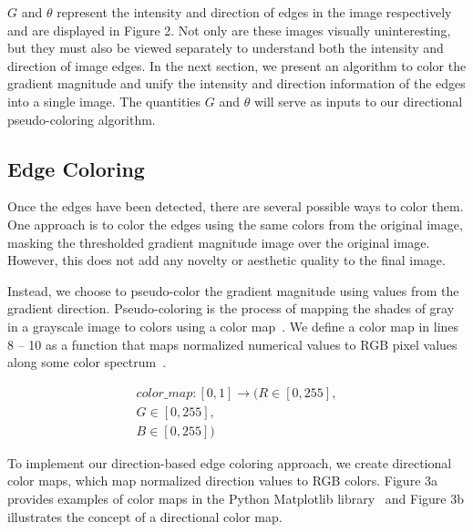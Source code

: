 \documentclass{article}
\begin{document}
$G$ and $\theta$ represent the intensity and direction of edges in the image respectively and are displayed in Figure 2. Not only are these images visually uninteresting, but they must also be viewed separately to understand both the intensity and direction of image edges. In the next section, we present an algorithm to color the gradient magnitude and unify the intensity and direction information of the edges into a single image. The quantities $G$ and $\theta$ will serve as inputs to our directional pseudo-coloring algorithm.

\subsection{Edge Coloring}

Once the edges have been detected, there are several possible ways to color them. One approach is to color the edges using the same colors from the original image, masking the thresholded gradient magnitude image over the original image. However, this does not add any novelty or aesthetic quality to the final image.

Instead, we choose to pseudo-color the gradient magnitude using values from the gradient direction. Pseudo-coloring is the process of mapping the shades of gray in a grayscale image to colors using a color map~\cite{pseudo_color}. We define a color map in lines 8 -- 10 as a function that maps normalized numerical values to RGB pixel values along some color spectrum~\cite{color_map}.

\begin{align}
color\_map: [0, 1] \rightarrow (R \in [0,255],\\ G \in [0,255],\\ B \in [0,255])
\end{align}

To implement our direction-based edge coloring approach, we create directional color maps, which map normalized direction values to RGB colors. Figure 3a provides examples of color maps in the Python Matplotlib library~\cite{Hunter} and Figure 3b illustrates the concept of a directional color map.
\end{document}
